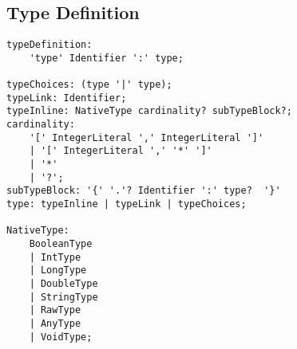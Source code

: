 \subsection{Type Definition}

\begin{lstlisting}[style=ANTLR ,float, caption={Jolie Type Definition},captionpos=b]
typeDefinition:
    'type' Identifier ':' type;

typeChoices: (type '|' type);
typeLink: Identifier;
typeInline: NativeType cardinality? subTypeBlock?;
cardinality:
	'[' IntegerLiteral ',' IntegerLiteral ']'
	| '[' IntegerLiteral ',' '*' ']'
	| '*'
	| '?';
subTypeBlock: '{' '.'? Identifier ':' type?  '}'
type: typeInline | typeLink | typeChoices;

NativeType:
	BooleanType
	| IntType
	| LongType
	| DoubleType
	| StringType
	| RawType
	| AnyType
    | VoidType;
    
\end{lstlisting}
